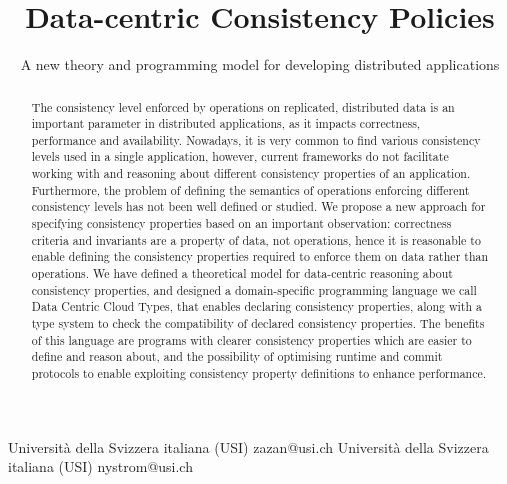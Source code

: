 \documentclass[preprint]{sigplanconf}
\begin{document}
\setlength{\pdfpageheight}{\paperheight}
\setlength{\pdfpagewidth}{\paperwidth}




\title{Data-centric Consistency Policies}
\subtitle{A new theory and programming model for developing
  distributed applications}

           {Università della Svizzera italiana (USI)}
           {zazan@usi.ch}
           {Università della Svizzera italiana (USI)}
           {nystrom@usi.ch}

\maketitle

\begin{abstract}
The consistency level enforced by operations on replicated, distributed data is 
an important parameter in distributed applications, as it impacts correctness, 
performance and availability. Nowadays, it is very common to find various consistency
levels used in a single application, however, current frameworks do not facilitate
working with and reasoning about different consistency properties of an application. 
Furthermore, the problem of defining the semantics of operations enforcing different 
consistency levels has not been well defined or studied. We propose a new
approach for specifying consistency properties based on an important observation: 
correctness criteria and invariants are a property of data, not operations, hence it is 
reasonable to enable defining the consistency properties required to enforce them on data 
rather than operations. We have defined a theoretical model for data-centric reasoning about consistency
properties, and designed a domain-specific programming language we call Data Centric Cloud Types, that enables 
declaring consistency properties, along with a type system to check the compatibility of declared consistency 
properties. The benefits of this language are programs with clearer consistency properties which are 
easier to define and reason about, and the possibility of optimising runtime and commit protocols to enable 
exploiting consistency property definitions to enhance performance.
\end{abstract}
\end{document}
